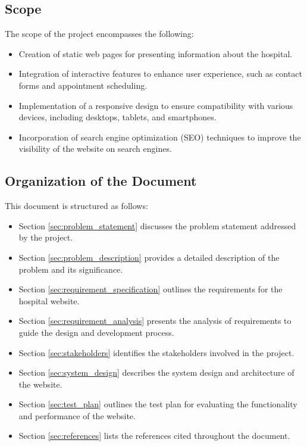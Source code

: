 \documentclass{article}
\begin{document}
\subsection{Scope}
The scope of the project encompasses the following:
\begin{itemize}
    \item Creation of static web pages for presenting information about the hospital.
    \item Integration of interactive features to enhance user experience, such as contact forms and appointment scheduling.
    \item Implementation of a responsive design to ensure compatibility with various devices, including desktops, tablets, and smartphones.
    \item Incorporation of search engine optimization (SEO) techniques to improve the visibility of the website on search engines.
\end{itemize}

\subsection{Organization of the Document}
This document is structured as follows: 
\begin{itemize}
    \item Section \ref{sec:problem_statement} discusses the problem statement addressed by the project.
    \item Section \ref{sec:problem_description} provides a detailed description of the problem and its significance.
    \item Section \ref{sec:requirement_specification} outlines the requirements for the hospital website.
    \item Section \ref{sec:requirement_analysis} presents the analysis of requirements to guide the design and development process.
    \item Section \ref{sec:stakeholders} identifies the stakeholders involved in the project.
    \item Section \ref{sec:system_design} describes the system design and architecture of the website.
    \item Section \ref{sec:test_plan} outlines the test plan for evaluating the functionality and performance of the website.
    \item Section \ref{sec:references} lists the references cited throughout the document.
\end{itemize}
\end{document}
